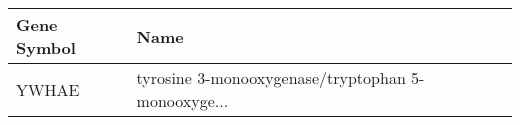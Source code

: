 \begin{tabular}{ll}
\toprule
Gene Symbol &                                               Name \\
\midrule
      YWHAE & tyrosine 3-monooxygenase/tryptophan 5-monooxyge... \\
\bottomrule
\end{tabular}
